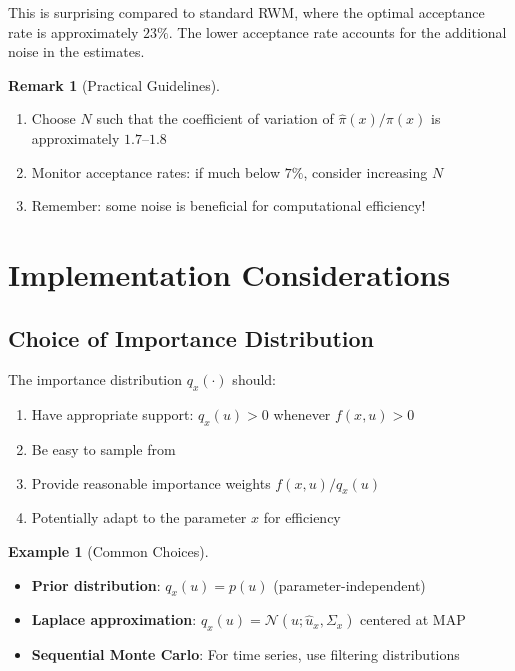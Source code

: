 \documentclass[11pt]{article}
\theoremstyle{definition}
\newtheorem{remark}{Remark}
\newtheorem{example}{Example}
\begin{document}
This is surprising compared to standard RWM, where the optimal acceptance rate is approximately $23\%$. The lower acceptance rate accounts for the additional noise in the estimates.

\begin{remark}[Practical Guidelines]
\begin{enumerate}
\item Choose $N$ such that the coefficient of variation of $\hat{\pi}(x)/\pi(x)$ is approximately $1.7$--$1.8$
\item Monitor acceptance rates: if much below $7\%$, consider increasing $N$
\item Remember: some noise is beneficial for computational efficiency!
\end{enumerate}
\end{remark}

\section{Implementation Considerations}

\subsection{Choice of Importance Distribution}

The importance distribution $q_x(\cdot)$ should:
\begin{enumerate}
\item Have appropriate support: $q_x(u) > 0$ whenever $f(x,u) > 0$
\item Be easy to sample from
\item Provide reasonable importance weights $f(x,u)/q_x(u)$
\item Potentially adapt to the parameter $x$ for efficiency
\end{enumerate}

\begin{example}[Common Choices]
\begin{itemize}
\item \textbf{Prior distribution}: $q_x(u) = p(u)$ (parameter-independent)
\item \textbf{Laplace approximation}: $q_x(u) = \mathcal{N}(u; \hat{u}_x, \Sigma_x)$ centered at MAP
\item \textbf{Sequential Monte Carlo}: For time series, use filtering distributions
\end{itemize}
\end{example}
\end{document}

